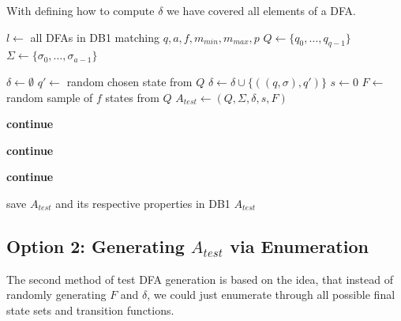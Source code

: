 With defining how to compute $\delta$ we have covered all elements of a DFA.

\vspace{0.2cm}
\begin{algorithmic}[1]
	
		\vspace{0.2cm}
	
		\State $l \gets$ all DFAs in DB1 matching $q, a, f, m_{min}, m_{max}, p$
		\State $Q \gets \{q_0, \ldots, q_{q-1}\}$
		\State $\Sigma \gets \{\sigma_0, \ldots, \sigma_{a-1}\}$
		
		\vspace{0.2cm}
		
		
		\vspace{0.2cm}
		
			\State $\delta \gets \emptyset$
					\State $q' \gets$ random chosen state from $Q$
					\State $\delta \gets \delta \cup \{((q,\sigma),q')\}$
				\EndFor
			\EndFor
			\State $s \gets 0$
			\State $F \gets$ random sample of $f$ states from $Q$
			\State $A_{test} \gets (Q, \Sigma, \delta, s, F)$
			
			\vspace{0.2cm}
			
			\State \textbf{continue}
			\EndIf
			
			\State \textbf{continue}
			\EndIf
			
			\State \textbf{continue}
			\EndIf
			
			\vspace{0.2cm}
			
			\State save $A_{test}$ and its respective properties in DB1
			\State\Return $A_{test}$
		\EndWhile
	\EndFunction
\end{algorithmic}
\vspace{0.2cm}

\subsection{Option 2: Generating $A_{test}$ via Enumeration}


The second method of test DFA generation is based on the idea, that instead of randomly generating $F$ and $\delta$, we could just enumerate through all possible final state sets and transition functions.

